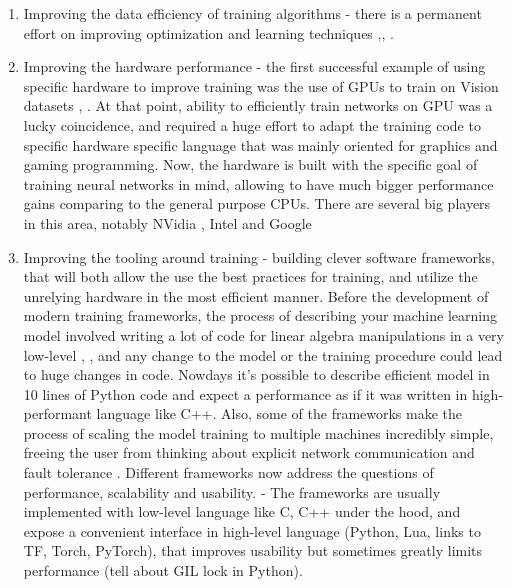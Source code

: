 \begin{enumerate}
\item Improving the data efficiency of training algorithms - there is a permanent effort on
improving optimization and learning techniques \cite{AdaGrad},\cite{ImageNetInHour}, \cite{BatchNorm}.

\item Improving the hardware performance - the first successful example of using specific
hardware to improve training was the use of GPUs to train on Vision datasets \cite{NgCudnn}, \cite{AlexNet}.
At that point, ability to efficiently train networks on GPU was a lucky coincidence, and
required a huge effort to adapt the training code to specific hardware specific language that
was mainly oriented for graphics and gaming programming. Now, the hardware is built with
the specific goal of training neural networks in mind, allowing to have much bigger performance
gains comparing to the general purpose CPUs. There are several big players in this area,
notably NVidia \cite{NVidiaGPU}, Intel \cite{Nervana} and Google \cite{TPU}

\item Improving the tooling around training - building clever software frameworks, that will 
both allow the use the best practices for training, and utilize the unrelying hardware
in the most efficient manner. Before the development of modern training frameworks, the process
of describing your machine learning model involved writing a lot of code for linear algebra
manipulations in a very low-level \cite{FORTRAN}, \cite{NumPy}, and any change to the model
or the training procedure could lead to huge changes in code.
Nowdays it's possible to describe efficient model in 10 lines of Python code and expect
a performance as if it was written in high-performant language like C++.
Also, some of the frameworks make the process of scaling the model training to multiple machines
incredibly simple, freeing the user from thinking about explicit network communication and
fault tolerance \cite{TensorFlow}.
Different frameworks now address the questions of performance, scalability and usability.
- The frameworks are usually implemented with low-level language like C, C++ under the hood, and expose
a convenient interface in high-level language (Python, Lua, links to TF, Torch, PyTorch),
that improves usability but sometimes greatly limits performance (tell about GIL lock in Python).

\end{enumerate}

